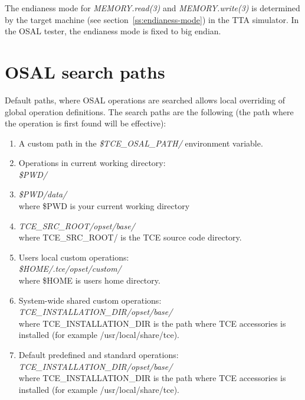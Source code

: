 \documentclass[twoside]{tceusermanual}
\begin{document}
The endianess mode for \emph{MEMORY.read(3)} and
\emph{MEMORY.write(3)} is determined by the target machine (see
section~\ref{ss:endianess-mode}) in the TTA simulator. In the OSAL
tester, the endianess mode is fixed to big endian.

\section{OSAL search paths}
\label{sec:osalpaths}

Default paths, where OSAL operations are searched allows local overriding of 
global operation definitions. The search paths are the following (the path
where the operation is first found will be effective):\\

\begin{enumerate}

\item
   A custom path in the \textit{\$TCE\_OSAL\_PATH/} environment variable. 

\item
   Operations in current working directory:\\
   \textit{\$PWD/}
      
\item
   \textit{\$PWD/data/} \\ where \$PWD is your current working directory
      

\item
   \textit{TCE\_SRC\_ROOT/opset/base/} \\ where TCE\_SRC\_ROOT/ is the
   TCE source code directory.

\item
   Users local custom operations: \\
   \textit{\$HOME/.tce/opset/custom/} \\ where \$HOME is users home directory.

\item
   System-wide shared custom operations:
   \textit{TCE\_INSTALLATION\_DIR/opset/base/} \\ where
   TCE\_INSTALLATION\_DIR is the path where TCE accessories is installed (for
   example /usr/local/share/tce).

\item
   Default predefined and standard operations: \\
   \textit{TCE\_INSTALLATION\_DIR/opset/base/} \\ where
   TCE\_INSTALLATION\_DIR is the path where TCE accessories is installed (for
   example /usr/local/share/tce).

\end{enumerate}
\end{document}
